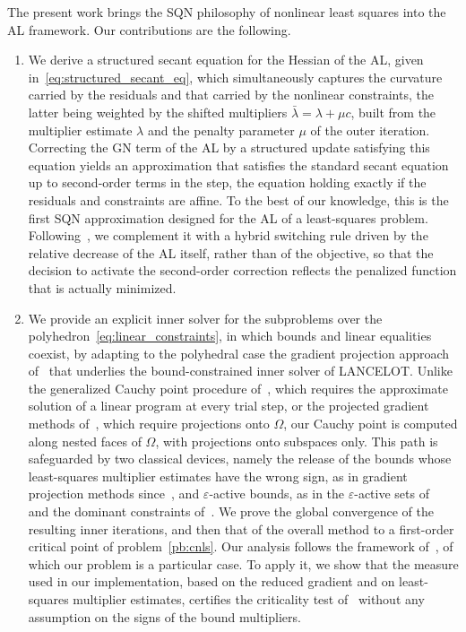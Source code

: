 \documentclass{article}
\numberwithin{equation}{section}
\newcommand{\rev}[1]{#1}
\theoremstyle{plain}
\begin{document}
The present work brings the SQN philosophy of nonlinear least squares into the AL framework. Our contributions are the following.
\begin{enumerate}[label=(\roman*), leftmargin=*, itemsep=2pt]
	\item We derive a structured secant equation for the Hessian of the AL, given in~\eqref{eq:structured_secant_eq}, which simultaneously captures the curvature carried by the residuals and that carried by the nonlinear constraints, the latter being weighted by the shifted multipliers $\bar{\lambda} = \lambda + \mu c$, built from the multiplier estimate $\lambda$ and the penalty parameter $\mu$ of the outer iteration. Correcting the GN term of the AL by a structured update satisfying this equation yields an approximation that satisfies the standard secant equation up to second-order terms in the step, the equation holding exactly if the residuals and constraints are affine. To the best of our knowledge, this is the first SQN approximation designed for the AL of a least-squares problem. Following~\cite{tjoabiegler:1991}, we complement it with a hybrid switching rule driven by the relative decrease of the AL itself, rather than of the objective, so that the decision to activate the second-order correction reflects the penalized function that is actually minimized.
	\item We provide an explicit inner solver for the subproblems over the polyhedron~\eqref{eq:linear_constraints}, in which bounds and linear equalities coexist, by adapting to the polyhedral case the gradient projection approach of~\cite{conn-etal:1988b} that underlies the bound-constrained inner solver of LANCELOT. Unlike the generalized Cauchy point procedure of~\cite{conn-etal:1993}, which requires the approximate solution of a linear program at every trial step, or the projected gradient methods of~\cite{calamaimore:1987}, which require projections onto $\Omega$, our Cauchy point is computed along nested faces of $\Omega$, with projections onto subspaces only. This path is safeguarded by two classical devices, namely the release of the bounds whose least-squares multiplier estimates have the wrong sign, as in gradient projection methods since~\cite{rosen:1960}, and $\varepsilon$-active bounds, as in the $\varepsilon$-active sets of~\cite{zoutendijk:1960,topkisveinott:1967,bertsekas:1982} and the dominant constraints of~\cite{conn-etal:1996b}. We prove the global convergence of the resulting inner iterations, and then that of the overall method to a first-order critical point of problem~\eqref{pb:cnls}. Our analysis follows the framework of~\cite{conn-etal:1996b}, of which our problem is a particular case\rev{. To apply it}, we show that the measure used in our implementation, based on the reduced gradient and on least-squares multiplier estimates, certifies the criticality test of~\cite{conn-etal:1996b} \rev{without any assumption on the signs of the bound multipliers}.

\end{enumerate}
\end{document}
